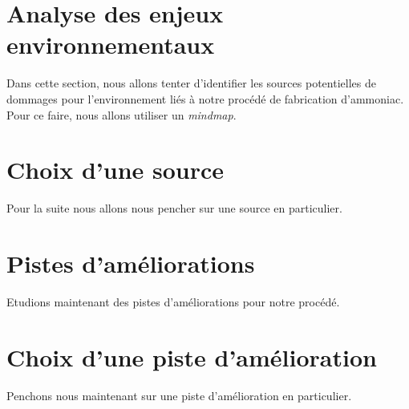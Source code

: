 

\section{Analyse des enjeux environnementaux}
Dans cette section, nous allons tenter 
d'identifier les sources potentielles de dommages
pour l'environnement liés à notre procédé de 
fabrication d'ammoniac. Pour ce faire,
nous allons utiliser un \textit{mindmap}.

\section{Choix d'une source}
Pour la suite nous allons nous pencher
sur une source en particulier.

\section{Pistes d'améliorations}
Etudions maintenant des pistes d'améliorations
pour notre procédé. 

\section{Choix d'une piste d'amélioration}
Penchons nous maintenant sur une piste
d'amélioration en particulier.

